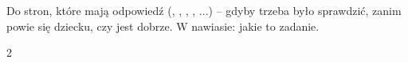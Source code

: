 \section*{\lblClave}

Do stron, które mają odpowiedź (\lblRodea, \lblCuenta, \lblBusca,
\lblUne, \lblCompleta...) -- gdyby trzeba było sprawdzić, zanim powie
się dziecku, czy jest dobrze. W nawiasie: jakie to zadanie.

\begin{multicols}{2}
\footnotesize
\raggedright
\begin{itemize}[leftmargin=0mm, label={}, itemsep=2mm, topsep=0mm]

\end{itemize}
\end{multicols}
\newpage
